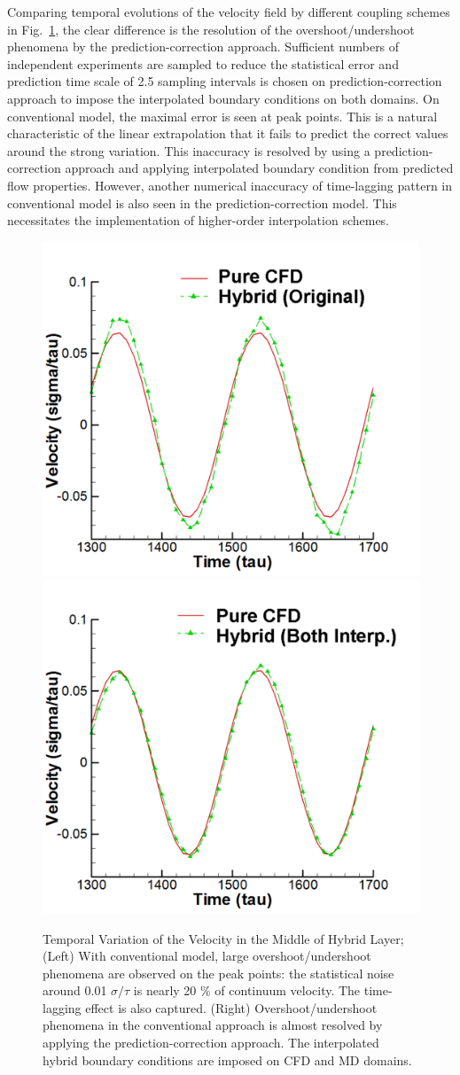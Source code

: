 \documentclass[preprint,12pt]{elsarticle}
\begin{document}
Comparing temporal evolutions of the velocity field by different coupling schemes in Fig.~\ref{Temporal1}, the clear difference is the resolution of the overshoot/undershoot phenomena by the prediction-correction approach. Sufficient numbers of independent experiments are sampled to reduce the statistical error and prediction time scale of 2.5 sampling intervals is chosen on prediction-correction approach to impose the interpolated boundary conditions on both domains. On conventional model, the maximal error is seen at peak points. This is a natural characteristic of the linear extrapolation that it fails to predict the correct values around the strong variation. This inaccuracy is resolved by using a prediction-correction approach and applying interpolated boundary condition from predicted flow properties. However, another numerical inaccuracy of time-lagging pattern in conventional model is also seen in the prediction-correction model. This necessitates the implementation of higher-order interpolation schemes.


\begin{figure}
\centering
\includegraphics[width=0.6\linewidth]{Stokes_Org_Multi.pdf}
\hskip 1cm
\includegraphics[width=0.6\linewidth]{Stokes_Both_Multi.pdf}
\vskip-0.2cm
\caption{\small Temporal Variation of the Velocity in the Middle of Hybrid Layer; (Left) With conventional model, large overshoot/undershoot phenomena are observed on the peak points: the statistical noise around 0.01 $\sigma/\tau$ is nearly 20 $\%$ of continuum velocity. The time-lagging effect is also captured. (Right) Overshoot/undershoot phenomena in the conventional approach is almost resolved by applying the prediction-correction approach. The interpolated hybrid boundary conditions are imposed on CFD and MD domains.}
\label{Temporal1}
\end{figure}
\end{document}
